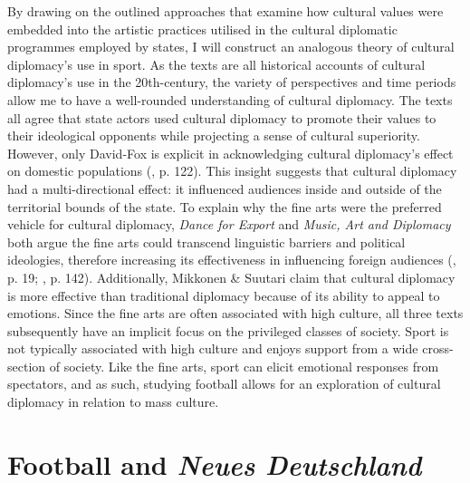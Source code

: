 By drawing on the outlined approaches that examine how cultural values were embedded into the artistic practices utilised in the cultural diplomatic programmes employed by states, I will construct an analogous theory of cultural diplomacy’s use in sport. As the texts are all historical accounts of cultural diplomacy’s use in the 20th-century, the variety of perspectives and time periods allow me to have a well-rounded understanding of cultural diplomacy. The texts all agree that state actors used cultural diplomacy to promote their values to their ideological opponents while projecting a sense of cultural superiority. However, only David-Fox is explicit in acknowledging cultural diplomacy’s effect on domestic populations (\citeyear{david-fox2011}, p. 122). This insight suggests that cultural diplomacy had a multi-directional effect: it influenced audiences inside and outside of the territorial bounds of the state. To explain why the fine arts were the preferred vehicle for cultural diplomacy, \textit{Dance for Export} and \textit{Music, Art and Diplomacy} both argue the fine arts could transcend linguistic barriers and political ideologies, therefore increasing its effectiveness in influencing foreign audiences (\cite{prevots1998}, p. 19; \cite{gonçalves2016}, p. 142). Additionally, Mikkonen \& Suutari claim that cultural diplomacy is more effective than traditional diplomacy because of its ability to appeal to emotions. Since the fine arts are often associated with high culture, all three texts subsequently have an implicit focus on the privileged classes of society. Sport is not typically associated with high culture and enjoys support from a wide cross-section of society. Like the fine arts, sport can elicit emotional responses from spectators, and as such, studying football allows for an exploration of cultural diplomacy in relation to mass culture.

\section{Football and \textit{Neues Deutschland}}

